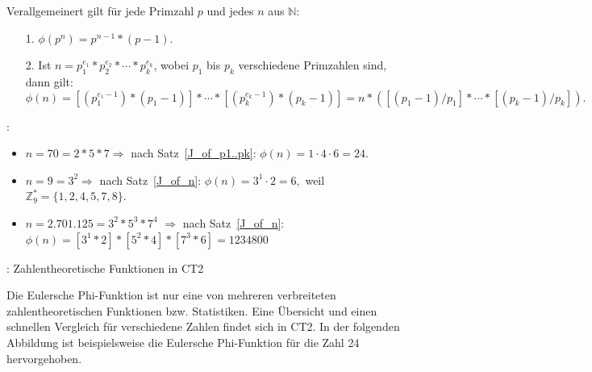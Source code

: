\begin{refsegment}
\begin{satz}\label{thm-zth-phinum} \label{J_of_n}

Verallgemeinert gilt für jede Primzahl $p$ und jedes $n$ aus $\mathbb{N}$:
\begin{itemize}
 \item[1.] $\phi(p^n) = p^{n-1} * (p-1)$.
 \item[2.] Ist $n = p_1^{e_1} * p_2^{e_2} * \cdots *p_k^{e_k}$,
           wobei $p_1$ bis $p_k$ verschiedene Primzahlen sind, dann gilt:
           $$\phi(n) = [(p_1^{e_1-1}) * (p_1-1)] * \cdots * [(p_k^{e_k-1})*(p_k - 1)] = n * ([(p_1-1) / p_1] * \cdots * [(p_k-1) / p_k]).$$
\end{itemize}
\end{satz}


\begin{minipage}{\textwidth}
\begin{example}{:}
\begin{itemize}
\item  $n=70=2*5*7 \Longrightarrow $ nach Satz~\ref{J_of_p1..pk}: $ \phi(n)= 1\cdot 4 \cdot 6 =24.$
\item  $n=9=3^2 \Longrightarrow$ nach Satz~\ref{J_of_n}: $ \phi(n)= 3^1\cdot 2 =6,$ weil  $\mathbb{Z}_9^* =\{ 1,2,4,5,7,8\}.$
\item $n = 2.701.125 = 3^2 * 5^3 * 7^4$ $\Longrightarrow$ nach Satz~\ref{J_of_n}:
$\phi(n) = [3^1 * 2] * [5^2 * 4] * [7^3 * 6] = \num{1234800}$
\end{itemize}
\end{example}
\end{minipage}



\begin{remark}{: Zahlentheoretische Funktionen in CT2}\\
\label{mc:NT-functions-in-CT2-01} \hypertarget{mc:NT-functions-in-CT2-01}{}

Die Eulersche Phi-Funktion ist nur eine von mehreren verbreiteten zahlentheoretischen
Funktionen bzw. Statistiken. Eine Übersicht und einen schnellen Vergleich für
verschiedene Zahlen findet sich in CT2. In der folgenden Abbildung ist beispielsweise
die Eulersche Phi-Funktion für die Zahl 24 hervorgehoben.


\end{remark}
\end{refsegment}
